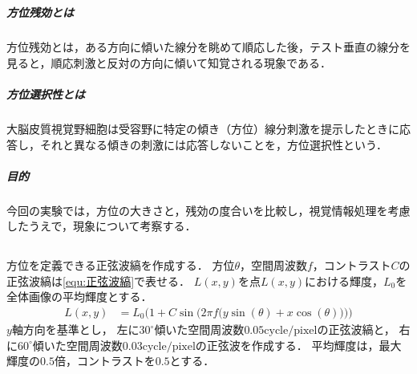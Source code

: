 \chapter{\kadaic}
\section{\purpose}
\paragraph{方位残効とは}
方位残効とは，ある方向に傾いた線分を眺めて順応した後，テスト垂直の線分を見ると，順応刺激と反対の方向に傾いて知覚される現象である\cite[p.5]{方位残効と運動残効のメカニズム}．
\paragraph{方位選択性とは}
大脳皮質視覚野細胞は受容野に特定の傾き（方位）線分刺激を提示したときに応答し，それと異なる傾きの刺激には応答しないことを，方位選択性という\cite[p.764]{方位選択性}．
\paragraph{目的}今回の実験では，方位の大きさと，残効の度合いを比較し，視覚情報処理を考慮したうえで，現象について考察する．
\section{\method}
\paragraph{\kadaica}
方位を定義できる正弦波縞を作成する．
方位\(\theta\)，空間周波数\(f\)，コントラスト\(C\)の正弦波縞は\eqref{equ:正弦波縞}で表せる．
\(L(x,y)\)を点\(L(x,y)\)における輝度，\(L_0\)を全体画像の平均輝度とする．
\begin{align}
    L(x,y) & = L_0\Bigg(1+C\sin\Big(2\pi f\big(y\sin(\theta)+x\cos(\theta)\big)\Big)\Bigg)\label{equ:正弦波縞}
\end{align}
\(y\)軸方向を基準とし，
左に\(30^\circ\)傾いた空間周波数\(0.05\textrm{cycle}/\textrm{pixel}\)の正弦波縞と，
右に\(60^{\circ}\)傾いた空間周波数\(0.03\textrm{cycle}/\textrm{pixel}\)の正弦波を作成する．
平均輝度は，最大輝度の\(0.5\)倍，コントラストを\(0.5\)とする．
